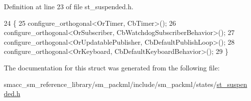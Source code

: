 Definition at line 23 of file st\+\_\+suspended.\+h.


\begin{DoxyCode}
24     \{
25         configure\_orthogonal<OrTimer, CbTimer>();   
26         configure\_orthogonal<OrSubscriber, CbWatchdogSubscriberBehavior>();
27         configure\_orthogonal<OrUpdatablePublisher, CbDefaultPublishLoop>();
28         configure\_orthogonal<OrKeyboard, CbDefaultKeyboardBehavior>();
29     \}
\end{DoxyCode}


The documentation for this struct was generated from the following file\+:\begin{DoxyCompactItemize}
\item 
smacc\+\_\+sm\+\_\+reference\+\_\+library/sm\+\_\+packml/include/sm\+\_\+packml/states/\hyperlink{st__suspended_8h}{st\+\_\+suspended.\+h}\end{DoxyCompactItemize}
